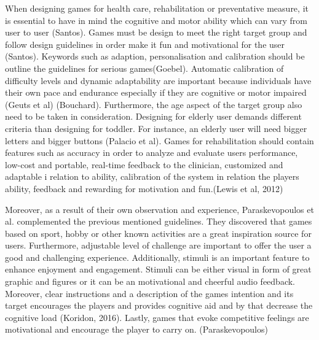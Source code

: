 \newline
When designing games for health care, rehabilitation or preventative measure, it is essential to have in mind the cognitive and motor ability which can vary from user to user (Santos). Games must be design to meet the right target group and follow design guidelines in order make it fun and motivational for the user (Santos). Keywords such as adaption, personalisation and calibration should be outline the guidelines for serious games(Goebel). Automatic calibration of difficulty levels and dynamic adaptability are important because individuals have their own pace and endurance especially if they are cognitive or motor impaired (Geuts et al) (Bouchard). Furthermore, the age aspect of the target group also need to be taken in consideration. Designing for elderly user demands different criteria than designing for toddler. For instance, an elderly user will need bigger letters and bigger buttons (Palacio et al). 
Games for rehabilitation  should contain features such as accuracy in order to analyze and evaluate users performance, low-cost and portable, real-time feedback to the clinician, customized and adaptable i relation to ability, calibration of the system in relation the players ability, feedback and rewarding for motivation and fun.(Lewis et al, 2012)

Moreover, as a result of their own observation and experience, Paraskevopoulos et al. complemented the previous mentioned guidelines. They discovered that games based on sport, hobby or other known activities are a great inspiration source for users. Furthermore, adjustable level of challenge are important to offer the user a good and challenging experience. Additionally, stimuli is an important feature to enhance enjoyment and engagement. Stimuli can be either visual in form of great graphic and figures or it can be an motivational and cheerful audio feedback. Moreover, clear instructions and a description of the games intention and its target encourages the players and provides cognitive aid and by that decrease the cognitive load (Koridon, 2016). Lastly, games that evoke competitive feelings are motivational and encourage the player to carry on. (Paraskevopoulos)




